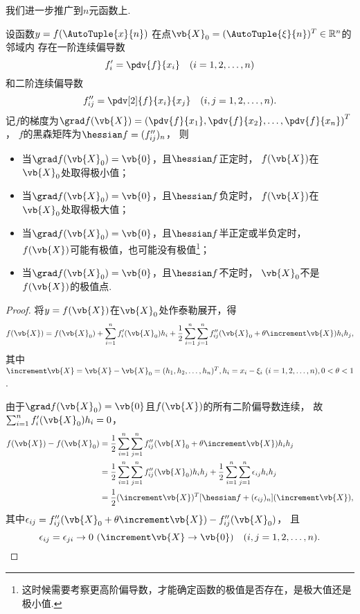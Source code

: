 我们进一步推广到\(n\)元函数上.
\begingroup
\def\x{\vb{X}}
\def\X#1{\x_{#1}}
\def\z{\vb{0}}

\begin{theorem}\label{theorem:多元函数微分法.n元函数极值存在的条件}
设函数\(y = f(\AutoTuple{x}{n})\)
在点\(\X0=(\AutoTuple{\xi}{n})^T\in\mathbb{R}^n\)的邻域内
存在一阶连续偏导数\begin{equation*}
	f'_i = \pdv{f}{x_i}
	\quad(i=1,2,\dotsc,n)
\end{equation*}
和二阶连续偏导数\begin{equation*}
	f''_{ij} = \pdv[2]{f}{x_i}{x_j}
	\quad(i,j=1,2,\dotsc,n).
\end{equation*}
记\(f\)的梯度为\(\grad f(\x)
= \left(\pdv{f}{x_1},\pdv{f}{x_2},\dotsc,\pdv{f}{x_n}\right)^T\)，
\(f\)的黑森矩阵为\(\hessian f = (f''_{ij})_n\)，
则\begin{itemize}
	\item 当\(\grad f(\X0) = \z\)，且\(\hessian f\)正定时，
	\(f(\x)\)在\(\X0\)处取得极小值；
	\item 当\(\grad f(\X0) = \z\)，且\(\hessian f\)负定时，
	\(f(\x)\)在\(\X0\)处取得极大值；
	\item 当\(\grad f(\X0) = \z\)，且\(\hessian f\)半正定或半负定时，
	\(f(\x)\)可能有极值，也可能没有极值\footnote{%
	这时候需要考察更高阶偏导数，才能确定函数的极值是否存在，是极大值还是极小值.}；
	\item 当\(\grad f(\X0) = \z\)，且\(\hessian f\)不定时，
	\(\X0\)不是\(f(\x)\)的极值点.
\end{itemize}
\begin{proof}
将\(y = f(\x)\)在\(\X0\)处作泰勒展开，得\begin{equation*}
	f(\x) = f(\X0)
	+ \sum_{i=1}^n f'_i(\X0) h_i
	+ \frac{1}{2} \sum_{i=1}^n \sum_{j=1}^n
		f''_{ij}(\X0+\theta\increment\x) h_i h_j,
\end{equation*}
其中\(\increment\x=\x-\X0=(h_1,h_2,\dotsc,h_n)^T,
h_i = x_i - \xi_i\ (i=1,2,\dotsc,n),
0<\theta<1\).

由于\(\grad f(\X0) = \z\)且\(f(\x)\)的所有二阶偏导数连续，
故\(\sum_{i=1}^n f'_i(\X0) h_i = 0\)，
\begin{align*}
	f(\x) - f(\X0)
	&= \frac{1}{2} \sum_{i=1}^n \sum_{j=1}^n
		f''_{ij}(\X0+\theta\increment\x) h_i h_j \\
	&= \frac{1}{2} \sum_{i=1}^n \sum_{j=1}^n
		f''_{ij}(\X0) h_i h_j
		+ \frac{1}{2} \sum_{i=1}^n \sum_{j=1}^n
		\epsilon_{ij} h_i h_j \\
	&= \frac{1}{2} (\increment\x)^T [\hessian f + (\epsilon_{ij})_n] (\increment\x),
\end{align*}
其中\(\epsilon_{ij} = f''_{ij}(\X0+\theta\increment\x) - f''_{ij}(\X0)\)，
且\begin{equation*}
	\epsilon_{ij} = \epsilon_{ji}\to0\ (\increment\x\to\z)
	\quad(i,j=1,2,\dotsc,n).
\end{equation*}


\end{proof}
\end{theorem}
